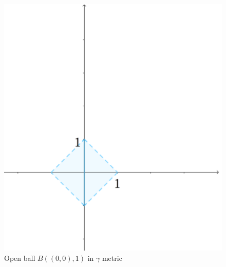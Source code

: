 \documentclass[12pt]{article}
\begin{document}
		\begin{figure}
		\centering
		\includegraphics[scale=0.20] {graph7}
		\caption{\label{fig:7} Open ball $B((0,0), 1) $ in $\gamma$ metric }
	\end{figure}
	
\end{document}
